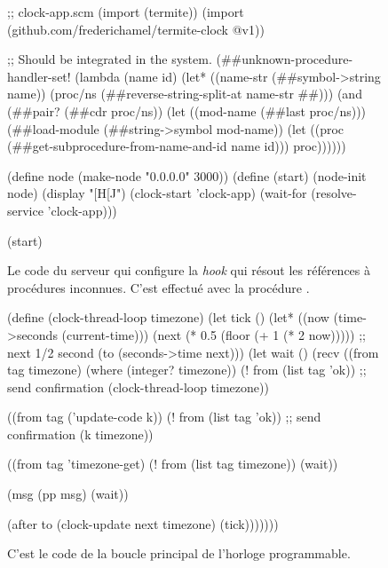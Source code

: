 \begin{figure}[h!]
\begin{center}
\begin{mplisting}{1}
;; clock-app.scm
(import (termite))
(import (github.com/frederichamel/termite-clock @v1))

;; Should be integrated in the system.
(##unknown-procedure-handler-set!
  (lambda (name id)
    (let* ((name-str (##symbol->string name))
           (proc/ns (##reverse-string-split-at name-str #\#)))
      (and (##pair? (##cdr proc/ns))
           (let ((mod-name (##last proc/ns)))
             (##load-module (##string->symbol mod-name))
             (let ((proc (##get-subprocedure-from-name-and-id name id)))
               proc))))))

(define node (make-node "0.0.0.0" 3000))
(define (start)
  (node-init node)
  (display "[H[J")
  (clock-start 'clock-app)
  (wait-for (resolve-service 'clock-app)))

(start)
\end{mplisting}
\end{center}
  \caption{Le code du serveur qui configure la \textit{hook}
    qui résout les références à procédures inconnues.
    C'est effectué avec la procédure .
    }
  \vspace*{4ex}
\end{figure}


\begin{figure}[h!]
  \centering
\begin{mplisting}{1}
(define (clock-thread-loop timezone)
  (let tick ()
    (let* ((now (time->seconds (current-time)))
           (next (* 0.5 (floor (+ 1 (* 2 now))))) ;; next 1/2 second
           (to (seconds->time next)))
      (let wait ()
        (recv
          ((from tag timezone) (where (integer? timezone))
           (! from (list tag 'ok)) ;; send confirmation
           (clock-thread-loop timezone))

          ((from tag ('update-code k))
           (! from (list tag 'ok)) ;; send confirmation
           (k timezone))

          ((from tag 'timezone-get)
           (! from (list tag timezone))
           (wait))

          (msg
           (pp msg)
           (wait))

          (after to
           (clock-update next timezone)
           (tick)))))))
\end{mplisting}
  \caption{C'est le code de la boucle principal de l'horloge programmable.}
  \label{fig:termite-clock@v1}
\end{figure}

